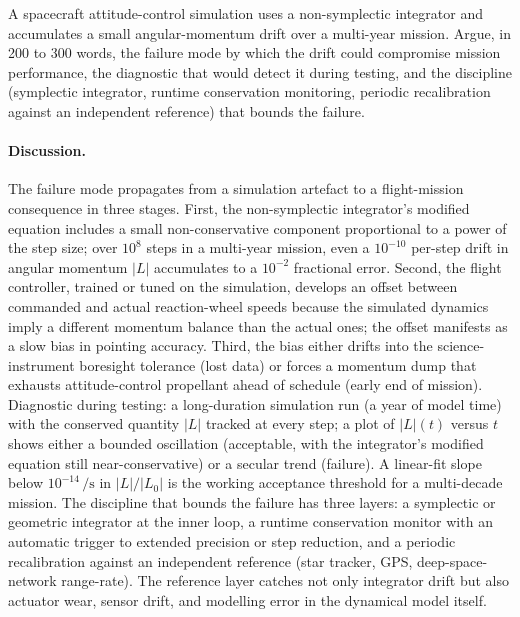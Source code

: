 \begin{exercise}
A spacecraft attitude-control simulation uses a non-symplectic
integrator and accumulates a small angular-momentum drift over
a multi-year mission. Argue, in 200 to 300 words, the failure
mode by which the drift could compromise mission performance,
the diagnostic that would detect it during testing, and the
discipline (symplectic integrator, runtime conservation
monitoring, periodic recalibration against an independent
reference) that bounds the failure.

\paragraph{Discussion.} The failure mode propagates from a
simulation artefact to a flight-mission consequence in three
stages. First, the non-symplectic integrator's modified equation
includes a small non-conservative component proportional to a
power of the step size; over $10^{8}$ steps in a multi-year
mission, even a $10^{-10}$ per-step drift in angular momentum
$|L|$ accumulates to a $10^{-2}$ fractional error. Second, the
flight controller, trained or tuned on the simulation, develops
an offset between commanded and actual reaction-wheel speeds
because the simulated dynamics imply a different momentum
balance than the actual ones; the offset manifests as a slow
bias in pointing accuracy. Third, the bias either drifts into
the science-instrument boresight tolerance (lost data) or
forces a momentum dump that exhausts attitude-control propellant
ahead of schedule (early end of mission). Diagnostic during
testing: a long-duration simulation run (a year of model time)
with the conserved quantity $|L|$ tracked at every step; a
plot of $|L|(t)$ versus $t$ shows either a bounded oscillation
(acceptable, with the integrator's modified equation still
near-conservative) or a secular trend (failure). A linear-fit
slope below $10^{-14}\,\si{\per\second}$ in $|L|/|L_{0}|$ is the
working acceptance threshold for a multi-decade mission. The
discipline that bounds the failure has three layers: a
symplectic or geometric integrator at the inner loop, a
runtime conservation monitor with an automatic trigger to
extended precision or step reduction, and a periodic
recalibration against an independent reference (star tracker,
GPS, deep-space-network range-rate). The reference layer
catches not only integrator drift but also actuator wear,
sensor drift, and modelling error in the dynamical model
itself.
\end{exercise}

